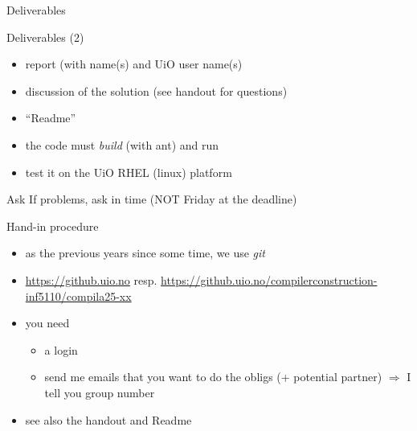 \documentclass{beamer}
\begin{document}
\begin{frame}[label={sec:org1bdc532}]{Deliverables}
\begin{block}{Deliverables (2)}
\begin{itemize}
\item report (with name(s) and UiO user name(s)
\item discussion of the solution (see handout for questions)
\end{itemize}

\begin{itemize}
\item ``Readme''
\end{itemize}
\end{block}
\begin{itemize}
\item the code must \emph{build} (with ant) and run
\item test it on the  UiO RHEL (linux) platform
\end{itemize}
\begin{block}{Ask}
If problems, \alert{ask in time}  (\alert{NOT} Friday at the deadline)
\end{block}
\end{frame}
\begin{frame}[label={sec:orgd55e6f9}]{Hand-in procedure}
\begin{itemize}
\item as the previous years since some time, we use  \emph{git}

\item \url{https://github.uio.no} resp.
\href{https://github.uio.no/compilerconstruction-inf5110/compila}{https://github.uio.no/compilerconstruction-inf5110/compila25-xx}

\item you need

\begin{itemize}
\item a login
\item send me emails that you want to do the obligs (+ potential partner)
\(\Rightarrow\) I tell you group number
\end{itemize}
\end{itemize}


\begin{itemize}
\item see also the \alert{handout} and \alert{Readme}
\end{itemize}
\end{frame}


\end{document}
